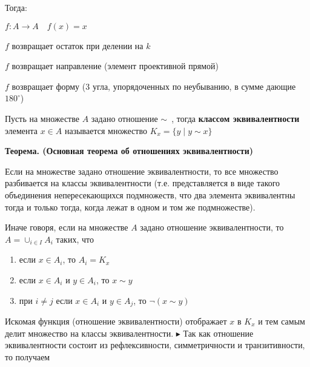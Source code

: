Тогда: 
\begin{flushleft}
    \hspace{10mm}\fbox{=} $f: A \to A \quad f(x) = x$
    
    \hspace{10mm} $f$ возвращает остаток при делении на $k$
    
    \hspace{10mm}\fbox{$\|$} $f$ возвращает направление (элемент проективной прямой)
    
    \hspace{10mm}\fbox{$\sim$} $f$ возвращает форму (3 угла, упорядоченных по неубыванию, в сумме дающие $180^{\circ}$)
\end{flushleft}
\newpage
Пусть на множестве $A$ задано отношение $\sim$ \,, тогда \textbf{классом эквивалентности} элемента $x \in A$ называется множество $K_x = \{y \; | \; y\sim x\}$
\\ \par \textbf{Теорема. (Основная теорема об отношениях эквивалентности) } \par Если на множестве задано отношение эквивалентности, то все множество разбивается на классы эквивалентности (т.е. представляется в виде такого объединения непересекающихся подмножеств, что два элемента эквивалентны тогда и только тогда, когда лежат в одном и том же подмножестве).
\par Иначе говоря, если на множестве $A$ задано отношение эквивалентности, то $A = \cup_{i \in I}A_i$ таких, что 
\begin{enumerate}
    \item если $x \in A_i$, то $A_i = K_x$
    \item если $x \in A_i$ и $y \in A_i$, то $x \sim y$
    \item при $i \neq j$ если $x \in A_i$ и $y \in A_j$, то $\neg(x \sim y)$
\end{enumerate}
Искомая функция (отношение эквивалентности) отображает $x$ в $K_x$ и тем самым делит множество на классы эквивалентности.
\newline $\blacktriangleright$
Так как отношение эквивалентности состоит из рефлексивности, симметричности и транзитивности, то получаем
